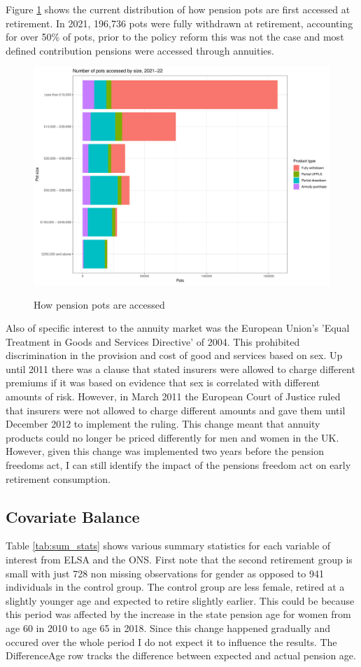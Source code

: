 \documentclass[12pt]{article}
\begin{document}
Figure \ref{fig:ann2122} shows the current distribution of how pension pots are first accessed at retirement.
In 2021, 196,736 pots were fully withdrawn at retirement, accounting for over 50\% of pots, prior to the policy
reform this was not the case and most defined contribution pensions were accessed through annuities.



\begin{figure}[h]
  \caption{How pension pots are accessed}
  \centering
  \includegraphics[width=0.7\columnwidth]{figures/annuity_pot_sizes.pdf}
  \label{fig:ann2122}
\end{figure}

Also of specific interest to the annuity market was the European Union's
'Equal Treatment in Goods and Services Directive' of 2004. This prohibited discrimination
in the provision and cost of good and services based on sex. Up until 2011 there was a clause that
stated insurers were allowed to charge different premiums if it was based on evidence that sex is
correlated with different amounts of risk. However, in March 2011 the European Court of Justice
ruled that insurers were not allowed to charge different amounts and gave them until December 2012
to implement the ruling. This change meant that annuity products could no longer be priced differently
for men and women in the UK. However, given this change was implemented two years before the pension
freedoms act, I can still identify the impact of the pensions freedom act on early retirement consumption.

\subsection{Covariate Balance}

Table \ref{tab:sum_stats} shows various summary statistics for each variable of interest from ELSA and the ONS.
First note that the second retirement group is small with just 728 non missing observations for gender as opposed
to 941 individuals in the control group. The control group are less female, retired at a slightly younger age and expected to
retire slightly earlier. This could be because this period was affected by the increase in the state pension age for
women from age 60 in 2010 to age 65 in 2018. Since this change happened gradually and occured over the whole period
I do not expect it to influence the results. The DifferenceAge row tracks the difference between expected and actual
pension age.
\end{document}

